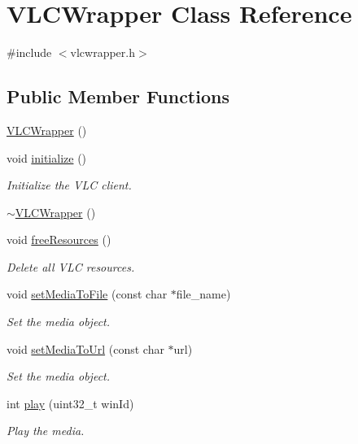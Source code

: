 \hypertarget{classVLCWrapper}{\section{V\-L\-C\-Wrapper Class Reference}
\label{classVLCWrapper}
}


{\ttfamily \#include $<$vlcwrapper.\-h$>$}

\subsection*{Public Member Functions}
\begin{DoxyCompactItemize}
\item 
\hyperlink{classVLCWrapper_a40bc9be7c713d8d6e78299abd848bd99}{V\-L\-C\-Wrapper} ()
\item 
void \hyperlink{classVLCWrapper_a23af9a9003d74b012967e72947141241}{initialize} ()
\begin{DoxyCompactList}\small\item\em Initialize the V\-L\-C client. \end{DoxyCompactList}\item 
\hyperlink{classVLCWrapper_a3afc6e20a87b76c2e8e7e7bd4da68987}{$\sim$\-V\-L\-C\-Wrapper} ()
\item 
void \hyperlink{classVLCWrapper_a58462a6c083affe4ac09e057d2303565}{free\-Resources} ()
\begin{DoxyCompactList}\small\item\em Delete all V\-L\-C resources. \end{DoxyCompactList}\item 
void \hyperlink{classVLCWrapper_a9f5993525559efb2fbdd434c79f040c7}{set\-Media\-To\-File} (const char $\ast$file\-\_\-name)
\begin{DoxyCompactList}\small\item\em Set the media object. \end{DoxyCompactList}\item 
void \hyperlink{classVLCWrapper_a82c02b12dbcb832abb26cd5c578aa180}{set\-Media\-To\-Url} (const char $\ast$url)
\begin{DoxyCompactList}\small\item\em Set the media object. \end{DoxyCompactList}\item 
int \hyperlink{classVLCWrapper_a75bc08d5b5d25ebcbdd50d3ecd1301bd}{play} (uint32\-\_\-t win\-Id)
\begin{DoxyCompactList}\small\item\em Play the media. \end{DoxyCompactList}\item 

\end{DoxyCompactItemize}
